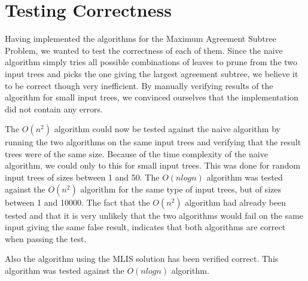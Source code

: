\chapter{Testing Correctness}
Having implemented the algorithms for the Maximum Agreement Subtree Problem, we wanted to test the correctness of each of them. Since the naive algorithm simply tries all possible combinations of leaves to prune from the two input trees and picks the one giving the largest agreement subtree, we believe it to be correct though very inefficient. By manually verifying results of the algorithm for small input trees, we convinced ourselves that the implementation did not contain any errors.

The $O(n^2)$ algorithm could now be tested against the naive algorithm by running the two algorithms on the same input trees and verifying that the result trees were of the same size. Because of the time complexity of the naive algorithm, we could only to this for small input trees. This was done for random input trees of sizes between 1 and 50. The $O(nlogn)$ algorithm was tested against the $O(n^2)$ algorithm for the same type of input trees, but of sizes between 1 and 10000. The fact that the $O(n^2)$ algorithm had already been tested and that it is very unlikely that the two algorithms would fail on the same input giving the same false result, indicates that both algorithms are correct when passing the test.

Also the algorithm using the MLIS solution has been verified correct. This algorithm was tested against the $O(nlogn)$ algorithm.